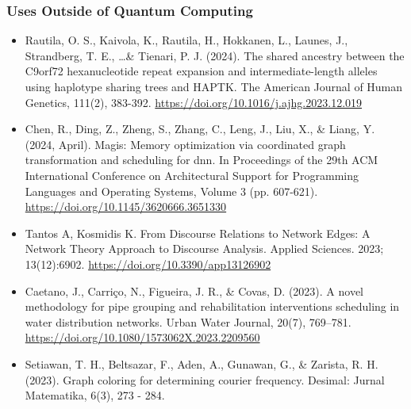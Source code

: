 \documentclass[aspectratio=169,11pt,hyperref={colorlinks=true}]{beamer}
\begin{document}
\begin{frame}
    \frametitle{Uses Outside of Quantum Computing}
    \footnotesize
    \begin{itemize}
        \item Rautila, O. S., Kaivola, K., Rautila, H., Hokkanen, L., Launes, J., Strandberg, T. E., \ldots \& Tienari, P. J. (2024). The shared ancestry between the C9orf72 hexanucleotide repeat expansion and intermediate-length alleles using haplotype sharing trees and HAPTK. The American Journal of Human Genetics, 111(2), 383-392. \href{https://doi.org/10.1016/j.ajhg.2023.12.019}{https://doi.org/10.1016/j.ajhg.2023.12.019}
        \item Chen, R., Ding, Z., Zheng, S., Zhang, C., Leng, J., Liu, X., \& Liang, Y. (2024, April). Magis: Memory optimization via coordinated graph transformation and scheduling for dnn. In Proceedings of the 29th ACM International Conference on Architectural Support for Programming Languages and Operating Systems, Volume 3 (pp. 607-621). \href{https://doi.org/10.1145/3620666.3651330}{https://doi.org/10.1145/3620666.3651330}
        \item Tantos A, Kosmidis K. From Discourse Relations to Network Edges: A Network Theory Approach to Discourse Analysis. Applied Sciences. 2023; 13(12):6902. \href{https://doi.org/10.3390/app13126902}{https://doi.org/10.3390/app13126902}
        \item Caetano, J., Carriço, N., Figueira, J. R., \& Covas, D. (2023). A novel methodology for pipe grouping and rehabilitation interventions scheduling in water distribution networks. Urban Water Journal, 20(7), 769–781. \href{https://doi.org/10.1080/1573062X.2023.2209560}{https://doi.org/10.1080/1573062X.2023.2209560}
        \item Setiawan, T. H., Beltsazar, F., Aden, A., Gunawan, G., \& Zarista, R. H. (2023). Graph coloring for determining courier frequency. Desimal: Jurnal Matematika, 6(3), 273 - 284.
    \end{itemize}
\end{frame}
\end{document}
